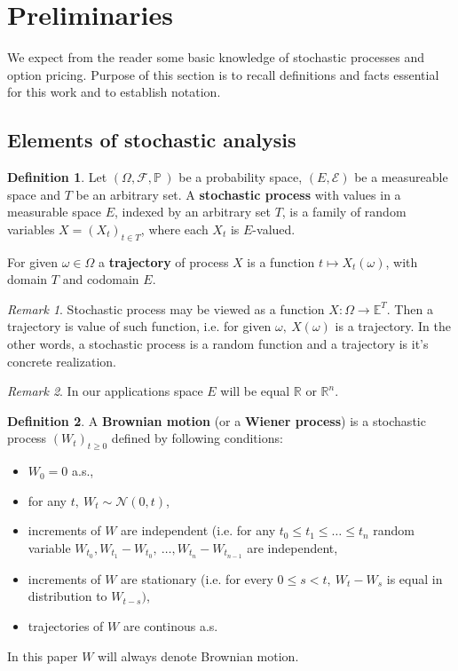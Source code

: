 \documentclass[a4paper,12pt, twoside]{article}
\theoremstyle{definition}
\newtheorem{mydef}{Definition}[section]
\theoremstyle{remark}
\newtheorem{remark}{Remark}
\def\P{{\mathbb{P}}\,}
\begin{document}
\section{Preliminaries}
We expect from the reader some basic knowledge of stochastic processes and option pricing. Purpose of this section is to recall definitions and facts essential for this work and to establish notation.

\subsection{Elements of stochastic analysis}
\begin{mydef}
 Let $(\Omega, \mathcal{F}, \P)$ be a probability space, $(E, \mathcal{E})$ be a measureable space and $T$ be an arbitrary set. A \textbf{stochastic process} with values in a measurable space $E$, indexed by an arbitrary set $T$, is a family of random variables $X = (X_t)_{t \in T}$, where each $X_t$ is $E$-valued.
 
 For given $\omega \in \Omega$ a \textbf{trajectory} of process $X$ is a function $t \mapsto X_t(\omega)$, with domain $T$ and codomain $E$.
\end{mydef}

\begin{remark}
 Stochastic process may be viewed as a function $X: \Omega \rightarrow \mathbb{E}^T$. Then a trajectory is value of such function, i.e. for given $\omega,\ X(\omega)$ is a trajectory. In the other words, a stochastic process is a random function and a trajectory is it's concrete realization.
\end{remark}

\begin{remark}
 In our applications space $E$ will be equal $\mathbb{R}$ or $\mathbb{R}^n$. 
\end{remark}

\begin{mydef}
 A \textbf{Brownian motion} (or a \textbf{Wiener process}) is a stochastic process $(W_t)_{t \geq 0}$ defined by following conditions:
 \begin{itemize}
  \item $W_0 = 0$ a.s.,
  \item for any $t,\ W_t \sim \mathcal{N}(0,t)$,
  \item increments of $W$ are independent (i.e. for any $t_0 \leq t_1 \leq \ldots \leq t_n$ random variable $W_{t_0}, W_{t_1} - W_{t_0},\ \ldots, W_{t_n} - W_{t_{n-1}}$ are independent,
  \item increments of $W$ are stationary (i.e. for every $0 \leq s < t,\ W_t-W_s$ is equal in distribution to $W_{t-s})$,
  \item trajectories of $W$ are continous a.s.
 \end{itemize}
\end{mydef}
\noindent In this paper $W$ will always denote Brownian motion.
\end{document}
